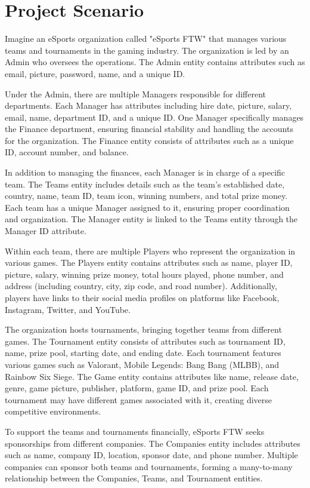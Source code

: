 \clearpage


\section{Project Scenario}
Imagine an eSports organization called "eSports FTW" that manages various teams and tournaments in the gaming industry. The organization is led by an Admin who oversees the operations. The Admin entity contains attributes such as email, picture, password, name, and a unique ID.

Under the Admin, there are multiple Managers responsible for different departments. Each Manager has attributes including hire date, picture, salary, email, name, department ID, and a unique ID. One Manager specifically manages the Finance department, ensuring financial stability and handling the accounts for the organization. The Finance entity consists of attributes such as a unique ID, account number, and balance.

In addition to managing the finances, each Manager is in charge of a specific team. The Teams entity includes details such as the team's established date, country, name, team ID, team icon, winning numbers, and total prize money. Each team has a unique Manager assigned to it, ensuring proper coordination and organization. The Manager entity is linked to the Teams entity through the Manager ID attribute.

Within each team, there are multiple Players who represent the organization in various games. The Players entity contains attributes such as name, player ID, picture, salary, winning prize money, total hours played, phone number, and address (including country, city, zip code, and road number). Additionally, players have links to their social media profiles on platforms like Facebook, Instagram, Twitter, and YouTube.

The organization hosts tournaments, bringing together teams from different games. The Tournament entity consists of attributes such as tournament ID, name, prize pool, starting date, and ending date. Each tournament features various games such as Valorant, Mobile Legends: Bang Bang (MLBB), and Rainbow Six Siege. The Game entity contains attributes like name, release date, genre, game picture, publisher, platform, game ID, and prize pool. Each tournament may have different games associated with it, creating diverse competitive environments.

To support the teams and tournaments financially, eSports FTW seeks sponsorships from different companies. The Companies entity includes attributes such as name, company ID, location, sponsor date, and phone number. Multiple companies can sponsor both teams and tournaments, forming a many-to-many relationship between the Companies, Teams, and Tournament entities.

